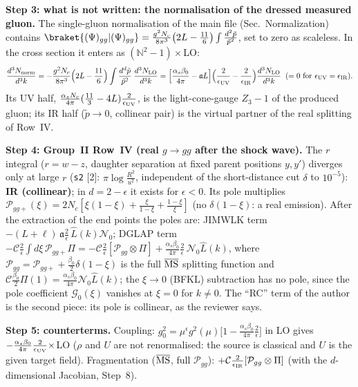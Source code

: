 \documentclass[10pt]{article}
\def\mf#1{\mathbb{#1}}
\begin{document}
\medskip
\noindent\textbf{Step 3: what is not written: the normalisation of the dressed measured gluon.} The single-gluon normalisation of the main file (Sec.~Normalization) contains $\braket{(\Psi)_{gg}|(\Psi)_{gg}}=\frac{g^{2}N_{c}}{8\pi^{3}}\big(2L-\frac{11}{6}\big)\int\frac{d^{2}\tilde p}{\tilde p^{2}}$, set to zero as scaleless. In the cross section it enters as $(\mf{N}^{2}-1)\times$LO:
\begin{align}
\frac{d^{3}N_{\rm norm}}{d^{3}k}=-\frac{g^{2}N_{c}}{8\pi^{3}}\Big(2L-\frac{11}{6}\Big)\int\frac{d^{d}\tilde p}{\tilde p^{2}}\;\frac{d^{3}N_{\rm LO}}{d^{3}k}
=\Big[\frac{\alpha_{s}\beta_{0}}{4\pi}-\mathfrak{a}L\Big]\Big(\frac{2}{\epsilon_{\rm UV}}-\frac{2}{\epsilon_{\rm IR}}\Big)\frac{d^{3}N_{\rm LO}}{d^{3}k}\;\;(=0\text{ for }\epsilon_{\rm UV}=\epsilon_{\rm IR}).
\label{eq:pd-norm}
\end{align}
Its UV half, $\frac{\alpha_{s}N_{c}}{4\pi}(\frac{11}{3}-4L)\frac{2}{\epsilon_{\rm UV}}$, is the light-cone-gauge $Z_{3}-1$ of the produced gluon; its IR half ($\tilde p\to0$, collinear pair) is the virtual partner of the real splitting of Row~IV.

\medskip
\noindent\textbf{Step 4: Group~II Row~IV (real $g\to gg$ after the shock wave).} The $r$ integral ($r=w-z$, daughter separation at fixed parent positions $y,y'$) diverges only at large $r$ (\texttt{s2} [2]: $\pi\log\frac{R^{2}}{u^{2}}$, independent of the short-distance cut $\delta$ to $10^{-5}$): \textbf{IR (collinear)}; in $d=2-\epsilon$ it exists for $\epsilon<0$. Its pole multiplies $\mathcal{P}_{gg+}(\xi)=2N_{c}[\xi(1-\xi)+\frac{\xi}{1-\xi}+\frac{1-\xi}{\xi}]$ (no $\delta(1-\xi)$: a real emission). After the extraction of the end points the poles are: JIMWLK term $-(L+\ell)\,\mathfrak{a}\frac{2}{\epsilon}\,\widehat{L}(k)\mathcal{N}_{0}$; DGLAP term $-\mathcal{C}\frac{2}{\epsilon}\int d\xi\,\mathcal{P}_{gg+}\Pi=-\mathcal{C}\frac{2}{\epsilon}[\mathcal{P}_{gg}\otimes\Pi]+\frac{\alpha_{s}\beta_{0}}{4\pi}\frac{2}{\epsilon}\,\mathcal{N}_{0}\widehat{L}(k)$, where $\mathcal{P}_{gg}=\mathcal{P}_{gg+}+\frac{\beta_{0}}{2}\delta(1-\xi)$ is the full $\overline{\rm MS}$ splitting function and $\mathcal{C}\frac{\beta_{0}}{2}\Pi(1)=\frac{\alpha_{s}\beta_{0}}{4\pi}\mathcal{N}_{0}\widehat{L}(k)$; the $\xi\to0$ (BFKL) subtraction has no pole, since the pole coefficient $\mathcal{G}_{0}(\xi)$ vanishes at $\xi=0$ for $k\neq0$. The ``RC'' term of the author is the second piece: its pole is collinear, as the reviewer says.

\medskip
\noindent\textbf{Step 5: counterterms.} Coupling: $g_{0}^{2}=\mu^{\epsilon}g^{2}(\mu)\big[1-\frac{\alpha_{s}\beta_{0}}{4\pi}\frac{2}{\epsilon}\big]$ in LO gives $-\frac{\alpha_{s}\beta_{0}}{4\pi}\frac{2}{\epsilon_{\rm UV}}\times$LO ($\rho$ and $U$ are not renormalised: the source is classical and $U$ is the given target field). Fragmentation ($\overline{\rm MS}$, full $\mathcal{P}_{gg}$): $+\mathcal{C}\frac{2}{\epsilon_{\rm IR}}[\mathcal{P}_{gg}\otimes\Pi]$ (with the $d$-dimensional Jacobian, Step~8).
\end{document}
